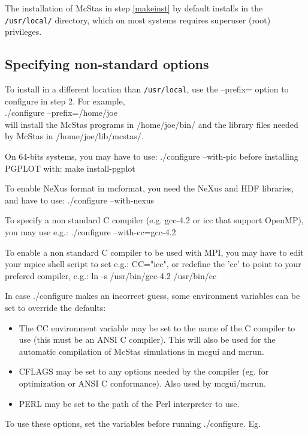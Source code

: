 \noindent The installation of McStas in step \ref{makeinst} by default installs in the
\texttt{/usr/local/} directory, which on most systems requires superuser (root)
privileges.

\subsection{Specifying non-standard options}
To install in a different location than \texttt{/usr/local}, use the --prefix= option to
configure in step 2. For example,\\

  ./configure --prefix=/home/joe\\

\noindent will install the McStas programs in /home/joe/bin/ and the
library files needed by McStas in /home/joe/lib/mcstas/.

\noindent On 64-bits systems, you may have to use: ./configure --with-pic before installing PGPLOT with: make install-pgplot

\noindent To enable NeXus format in mcformat, you need the NeXus and HDF libraries, and have to use: ./configure --with-nexus

\noindent To specify a non standard C compiler (e.g. gcc-4.2 or icc that support OpenMP), you may use e.g.: ./configure --with-cc=gcc-4.2

\noindent To enable a non standard C compiler to be used with MPI, you may have to edit your mpicc shell script to set e.g.: CC="icc", or redefine the 'cc' to point to your prefered compiler, e.g.: ln -s /usr/bin/gcc-4.2 /usr/bin/cc

In case ./configure makes an incorrect guess, some environment variables
can be set to override the defaults:
\begin{itemize}
\item{The CC environment variable may be set to the name of the C compiler
   to use (this must be an ANSI C compiler). This will also be used for
   the automatic compilation of McStas simulations in mcgui and
   mcrun.}
\item{CFLAGS may be set to any options needed by the compiler (eg. for
   optimization or ANSI C conformance). Also used by mcgui/mcrun.}
\item{PERL may be set to the path of the Perl interpreter to use.}
\end{itemize}
\noindent To use these options, set the variables before running ./configure. Eg.\\

